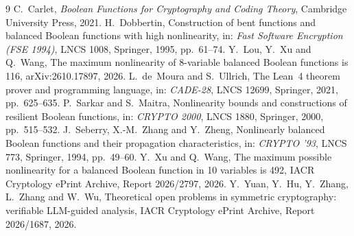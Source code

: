 \documentclass[11pt]{amsart}
\theoremstyle{remark}
\begin{document}
\begin{thebibliography}{9}
 C.~Carlet, \emph{Boolean Functions for Cryptography and Coding Theory},
Cambridge University Press, 2021.
 H.~Dobbertin, Construction of bent functions and balanced Boolean functions
with high nonlinearity, in: \emph{Fast Software Encryption (FSE 1994)}, LNCS 1008, Springer, 1995,
pp.~61--74.
 Y.~Lou, Y.~Xu and Q.~Wang, The maximum nonlinearity of 8-variable balanced
Boolean functions is 116, arXiv:2610.17897, 2026.
 L.~de~Moura and S.~Ullrich, The Lean~4 theorem prover and programming language,
in: \emph{CADE-28}, LNCS 12699, Springer, 2021, pp.~625--635.
 P.~Sarkar and S.~Maitra, Nonlinearity bounds and constructions of resilient
Boolean functions, in: \emph{CRYPTO 2000}, LNCS 1880, Springer, 2000, pp.~515--532.
 J.~Seberry, X.-M.~Zhang and Y.~Zheng, Nonlinearly balanced Boolean functions and
their propagation characteristics, in: \emph{CRYPTO '93}, LNCS 773, Springer, 1994, pp.~49--60.
 Y.~Xu and Q.~Wang, The maximum possible nonlinearity for a balanced Boolean
function in 10 variables is 492, IACR Cryptology ePrint Archive, Report 2026/2797, 2026.
 Y.~Yuan, Y.~Hu, Y.~Zhang, L.~Zhang and W.~Wu, Theoretical open problems in
symmetric cryptography: verifiable LLM-guided analysis, IACR Cryptology ePrint Archive,
Report 2026/1687, 2026.
\end{thebibliography}
\end{document}
